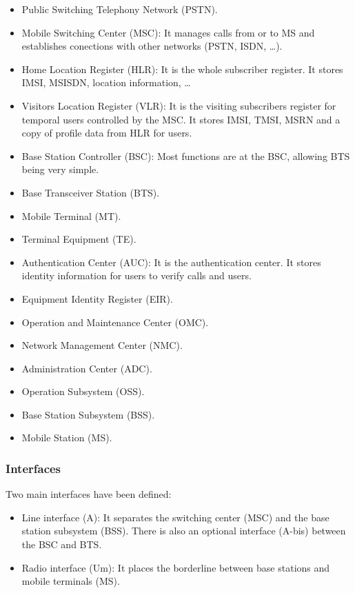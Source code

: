\documentclass[
	12pt,
	twoside
]{book}
\begin{document}
\begin{itemize}
	\item Public Switching Telephony Network (PSTN).
	\item Mobile Switching Center (MSC): It manages calls from or to MS and establishes conections with other networks (PSTN, ISDN, \ldots).
	\item Home Location Register (HLR): It is the whole subscriber register. It stores IMSI, MSISDN, location information, \ldots
	\item Visitors Location Register (VLR): It is the visiting subscribers register for temporal users controlled by the MSC. It stores IMSI, TMSI, MSRN and a copy of profile data from HLR for users.
	\item Base Station Controller (BSC): Most functions are at the BSC, allowing BTS being very simple.
	\item Base Transceiver Station (BTS).
	\item Mobile Terminal (MT).
	\item Terminal Equipment (TE).
	\item Authentication Center (AUC): It is the authentication center. It stores identity information for users to verify calls and users.
	\item Equipment Identity Register (EIR).
	\item Operation and Maintenance Center (OMC).
	\item Network Management Center (NMC).
	\item Administration Center (ADC).
	\item Operation Subsystem (OSS).
	\item Base Station Subsystem (BSS).
	\item Mobile Station (MS).
\end{itemize}

\subsubsection{Interfaces}

Two main interfaces have been defined:

\begin{itemize}
	\item Line interface (A): It separates the switching center (MSC) and the base station subsystem (BSS). There is also an optional interface (A-bis) between the BSC and BTS.
	\item Radio interface (Um): It places the borderline between base stations and mobile terminals (MS).
\end{itemize}
\end{document}
